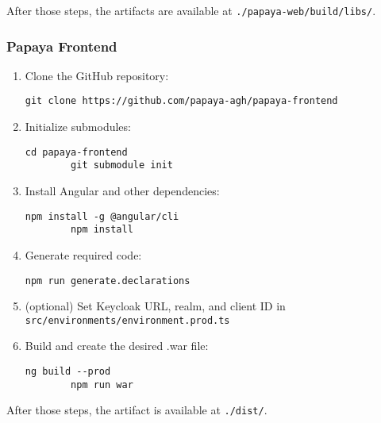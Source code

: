 After those steps, the artifacts are available at
\texttt{./papaya-web/build/libs/}.

\subsubsection*{Papaya Frontend}

\begin{enumerate}
    \item Clone the GitHub repository:
    \begin{lstlisting}[gobble=8]
        git clone https://github.com/papaya-agh/papaya-frontend
    \end{lstlisting}

    \item Initialize submodules:
    \begin{lstlisting}[gobble=8]
        cd papaya-frontend
        git submodule init
    \end{lstlisting}

    \item Install Angular and other dependencies:
    \begin{lstlisting}[gobble=8]
        npm install -g @angular/cli
        npm install
    \end{lstlisting}

    \item Generate required code:
    \begin{lstlisting}[gobble=8]
        npm run generate.declarations
    \end{lstlisting}

    \item (optional) Set Keycloak URL, realm, and client ID in
    \texttt{src/environments/environment.prod.ts}

    \item Build and create the desired .war file:
    \begin{lstlisting}[gobble=8]
        ng build --prod
        npm run war
    \end{lstlisting}
\end{enumerate}

After those steps, the artifact is available at \texttt{./dist/}.
